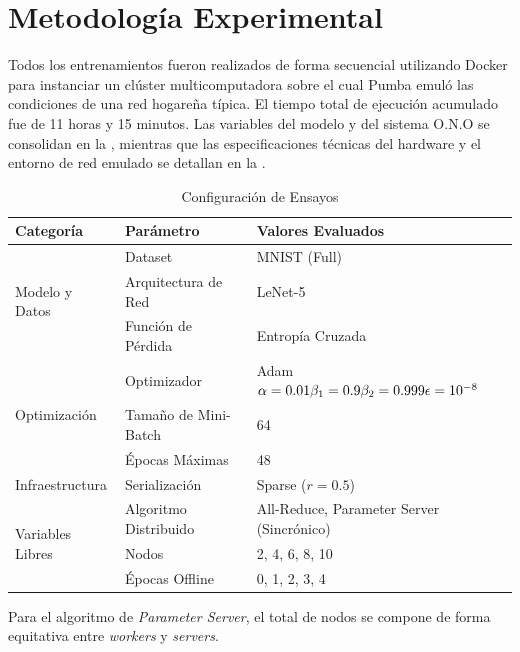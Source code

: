 
\section{Metodología Experimental}

Todos los entrenamientos fueron realizados de forma secuencial utilizando Docker para instanciar un clúster multicomputadora sobre el cual Pumba emuló las condiciones de una red hogareña típica. El tiempo total de ejecución acumulado fue de 11 horas y 15 minutos. Las variables del modelo y del sistema O.N.O se consolidan en la , mientras que las especificaciones técnicas del hardware y el entorno de red emulado se detallan en la .

\begin{table}[ht]
	\caption{Configuración de Ensayos}
	\label{tab:configs}
	\centering
	\footnotesize
	\begin{tabular}{llp{2.4cm}}
		\toprule
		\textbf{Categoría} & \textbf{Parámetro} & \textbf{Valores Evaluados} \\
		\midrule
		\multirow{3}{*}{Modelo y Datos} & Dataset & MNIST (Full)~\cite{lecun1998gradient} \\
		 & Arquitectura de Red & LeNet-5 \\
		 & Función de Pérdida & Entropía Cruzada \\
		\midrule
		\multirow{3}{*}{Optimización} & Optimizador & Adam \newline $\alpha = 0.01 \newline \beta_1 = 0.9 \newline \beta_2 = 0.999 \newline \epsilon = 10^{-8}$ \\
		 & Tamaño de Mini-Batch & 64 \\
		 & Épocas Máximas & 48 \\
		\midrule
		Infraestructura & Serialización & Sparse ($r = 0.5$) \\
		\midrule
		\multirow{3}{*}{Variables Libres} & Algoritmo Distribuido & All-Reduce, Parameter Server (Sincrónico) \\
		 & Nodos & 2, 4, 6, 8, 10 \\
		 & Épocas Offline & 0, 1, 2, 3, 4 \\
		\bottomrule
	\end{tabular}
	\begin{tablenotes}
		\item[*] Para el algoritmo de \emph{Parameter Server}, el total de nodos se compone de forma equitativa entre \emph{workers} y \emph{servers}.
	\end{tablenotes}
\end{table}

